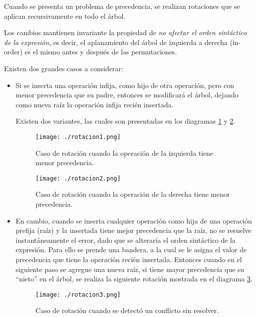 Cuando se presenta un problema de precedencia, se realizan rotaciones que se aplican recursivamente en todo el árbol. 

Los cambios mantienen invariante la propiedad de \textit{no afectar el orden sintáctico de la expresión}, es decir, el aplanamiento del árbol de izquierda a derecha (in-order) es el mismo antes y después de las permutaciones.

Existen dos grandes casos a considerar:

\begin{itemize}
\item Si se inserta una operación infija, como hijo de otra operación, pero con menor precedencia que su padre, entonces se modificará el árbol, dejando como nueva raíz la operación infija recién insertada. 

Existen dos variantes, las cuales son presentadas en los diagramas \ref{rotacion1} y \ref{rotacion2}.

\begin{figure}\centering
\texttt{[image: ./rotacion1.png]}
\caption{\label{rotacion1} Caso de rotación cuando la operación de la izquierda tiene menor precedencia.}
\end{figure}

\begin{figure}\centering
\texttt{[image: ./rotacion2.png]}
\caption{\label{rotacion2} Caso de rotación cuando la operación de la derecha tiene menor precedencia.}
\end{figure}

\item En cambio, cuando se inserta cualquier operación como hija de una operación prefija (raíz) y la insertada tiene mejor precedencia que la raíz, no se resuelve instantáneamente el error, dado que se alteraría el orden sintáctico de la expresión. Para ello se prende una bandera, a la cual se le asigna el valor de precedencia que tiene la operación recién insertada. Entonces cuando en el siguiente paso se agregue una nueva raíz, si tiene mayor precedencia que su ``nieto'' en el árbol, se realiza la siguiente rotación mostrada en el diagrama \ref{rotacion3}.

\begin{figure}\centering
\texttt{[image: ./rotacion3.png]}
\caption{\label{rotacion3} Caso de rotación cuando se detectó un conflicto sin resolver.}
\end{figure}
\end{itemize}

